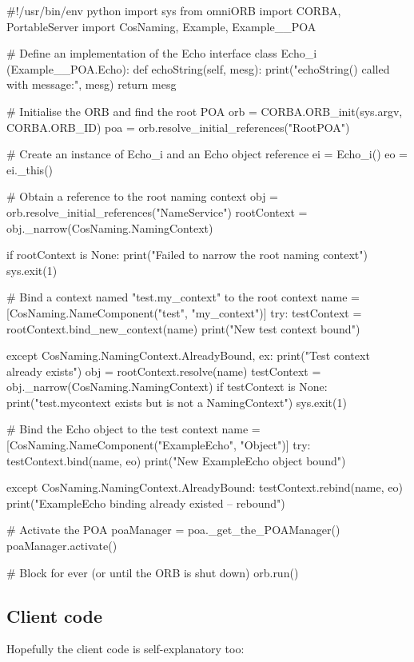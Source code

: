 \documentclass[11pt,oneside,a4paper]{book}
\begin{document}
\begin{pylisting}
#!/usr/bin/env python
import sys
from omniORB import CORBA, PortableServer
import CosNaming, Example, Example__POA

# Define an implementation of the Echo interface
class Echo_i (Example__POA.Echo):
    def echoString(self, mesg):
        print("echoString() called with message:", mesg)
        return mesg

# Initialise the ORB and find the root POA
orb = CORBA.ORB_init(sys.argv, CORBA.ORB_ID)
poa = orb.resolve_initial_references("RootPOA")

# Create an instance of Echo_i and an Echo object reference
ei = Echo_i()
eo = ei._this()

# Obtain a reference to the root naming context
obj         = orb.resolve_initial_references("NameService")
rootContext = obj._narrow(CosNaming.NamingContext)

if rootContext is None:
    print("Failed to narrow the root naming context")
    sys.exit(1)

# Bind a context named "test.my_context" to the root context
name = [CosNaming.NameComponent("test", "my_context")]
try:
    testContext = rootContext.bind_new_context(name)
    print("New test context bound")
    
except CosNaming.NamingContext.AlreadyBound, ex:
    print("Test context already exists")
    obj = rootContext.resolve(name)
    testContext = obj._narrow(CosNaming.NamingContext)
    if testContext is None:
        print("test.mycontext exists but is not a NamingContext")
        sys.exit(1)

# Bind the Echo object to the test context
name = [CosNaming.NameComponent("ExampleEcho", "Object")]
try:
    testContext.bind(name, eo)
    print("New ExampleEcho object bound")

except CosNaming.NamingContext.AlreadyBound:
    testContext.rebind(name, eo)
    print("ExampleEcho binding already existed -- rebound")

# Activate the POA
poaManager = poa._get_the_POAManager()
poaManager.activate()

# Block for ever (or until the ORB is shut down)
orb.run()
\end{pylisting}


\subsection{Client code}

Hopefully the client code is self-explanatory too:
\end{document}

